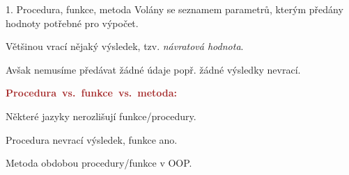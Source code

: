 \documentclass[czech]{beamer}
\begin{document}
\begin{frame}{1. Procedura, funkce, metoda}
{\scriptsize Volány se seznamem parametrů, kterým předány hodnoty potřebné
pro výpočet.}{\scriptsize\par}

{\scriptsize Většinou vrací nějaký výsledek, tzv. }{\scriptsize\emph{návratová
hodnota}}{\scriptsize . }{\scriptsize\par}

{\scriptsize Avšak nemusíme předávat žádné údaje popř. žádné výsledky
nevrací.\medskip{}
}{\scriptsize\par}

{\scriptsize\textbf{\textcolor{brown}{Procedura~vs.~funkce~vs.~metoda:}}}{\scriptsize\par}

{\scriptsize Některé jazyky nerozlišují funkce/procedury.}{\scriptsize\par}

{\scriptsize Procedura nevrací výsledek, funkce ano.}{\scriptsize\par}

{\scriptsize Metoda obdobou procedury/funkce v OOP.}{\scriptsize\par}
\end{frame}
\end{document}
